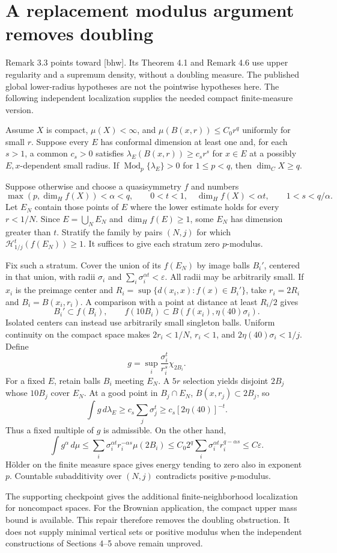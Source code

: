 \documentclass[10pt]{article}
\begin{document}
\section*{A replacement modulus argument removes doubling}
Remark 3.3 points toward [bhw]. Its Theorem 4.1 and Remark 4.6 use upper regularity and a supremum density, without a doubling measure. The published global lower-radius hypotheses are not the pointwise hypotheses here. The following independent localization supplies the needed compact finite-measure version.\par
Assume \(X\) is compact, \(\mu(X)<\infty\), and \(\mu(B(x,r))\le C_0r^q\) uniformly for small \(r\). Suppose every \(E\) has conformal dimension at least one and, for each \(s>1\), a common \(c_s>0\) satisfies \(\lambda_E(B(x,r))\ge c_sr^s\) for \(x\in E\) at a possibly \(E,x\)-dependent small radius. If \(\operatorname{Mod}_p\{\lambda_E\}>0\) for \(1\le p<q\), then \(\dim_C X\ge q\).\par
Suppose otherwise and choose a quasisymmetry \(f\) and numbers \[\max(p,\dim_H f(X))<\alpha<q,\qquad
 0<t<1,\quad \dim_H f(X)<\alpha t,\qquad
 1<s<q/\alpha .\] Let \(E_N\) contain those points of \(E\) where the lower estimate holds for every \(r<1/N\). Since \(E=\bigcup_NE_N\) and \(\dim_H f(E)\ge1\), some \(E_N\) has dimension greater than \(t\). Stratify the family by pairs \((N,j)\) for which \(\mathcal H^t_{1/j}(f(E_N))\ge1\). It suffices to give each stratum zero \(p\)-modulus.\par
Fix such a stratum. Cover the union of its \(f(E_N)\) by image balls \(B_i'\), centered in that union, with radii \(\sigma_i\) and \(\sum_i\sigma_i^{\alpha t}<\varepsilon\). All radii may be arbitrarily small. If \(x_i\) is the preimage center and \(R_i=\sup\{d(x_i,x):f(x)\in B_i'\}\), take \(r_i=2R_i\) and \(B_i=B(x_i,r_i)\). A comparison with a point at distance at least \(R_i/2\) gives \[B_i'\subset f(B_i),\qquad
 f(10B_i)\subset B(f(x_i),\eta(40)\sigma_i).\] Isolated centers can instead use arbitrarily small singleton balls. Uniform continuity on the compact space makes \(2r_i<1/N\), \(r_i<1\), and \(2\eta(40)\sigma_i<1/j\). Define \[g=\sup_i\frac{\sigma_i^t}{r_i^s}\chi_{2B_i}.\] For a fixed \(E\), retain balls \(B_i\) meeting \(E_N\). A \(5r\) selection yields disjoint \(2B_j\) whose \(10B_j\) cover \(E_N\). At a good point in \(B_j\cap E_N\), \(B(x,r_j)\subset2B_j\), so \[\int g\,d\lambda_E
 \ge c_s\sum_j\sigma_j^t
 \ge c_s[2\eta(40)]^{-t}.\] Thus a fixed multiple of \(g\) is admissible. On the other hand, \[\int g^\alpha\,d\mu
 \le \sum_i\sigma_i^{\alpha t}r_i^{-\alpha s}\mu(2B_i)
 \le C_0 2^q\sum_i\sigma_i^{\alpha t}r_i^{q-\alpha s}
 \le C\varepsilon .\] Hölder on the finite measure space gives energy tending to zero also in exponent \(p\). Countable subadditivity over \((N,j)\) contradicts positive \(p\)-modulus.\par
The supporting checkpoint gives the additional finite-neighborhood localization for noncompact spaces. For the Brownian application, the compact upper mass bound is available. This repair therefore removes the doubling obstruction. It does not supply minimal vertical sets or positive modulus when the independent constructions of Sections 4–5 above remain unproved.\par
\end{document}
